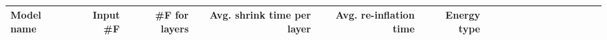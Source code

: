 \begin{table*}
\centering
{}
\setlength{\tabcolsep}{5.5pt}
\begin{tabular}{l r r r r r r r r r r r r r r r r r}
\rowcolor{white}
Model name  & Input \#F & \#F for layers & Avg. shrink time per layer & Avg.
re-inflation time & Energy type\\
\midrule
\bottomrule
\end{tabular}
\caption{}
\label{tab:timings}
\end{table*}
